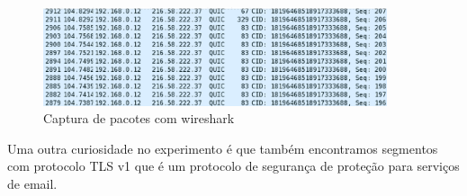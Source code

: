 \begin{figure}[h]
  \centering
  \includegraphics[width=0.9\textwidth]{figuras/f10.eps}
  \caption{Captura de pacotes com wireshark}
  \label{fig:f10}
\end{figure}

Uma outra curiosidade no experimento é que também encontramos segmentos com
protocolo TLS v1 que é um protocolo de segurança de proteção para serviços de email.

